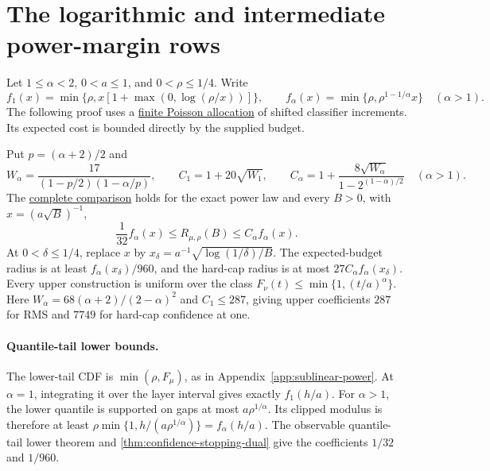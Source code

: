 \section{The logarithmic and intermediate power-margin rows}
\label{app:shifted-power}

Let $1\le\alpha<2$, $0<a\le1$, and $0<\rho\le1/4$. Write
\[
 f_1(x)=\min\{\rho,x[1+\max(0,\log(\rho/x))]\},\qquad
 f_\alpha(x)=\min\{\rho,\rho^{1-1/\alpha}x\}\quad(\alpha>1).
\]
The following proof uses a \href{https://github.com/davidiach/adaptive-threshold-estimation/blob/1f1a0229b16f16d9f7f415519f2c73d9af09b7e9/lean/ThresholdHC/ShiftedPower/Allocated.lean}{finite Poisson allocation} of shifted classifier
increments. Its expected cost is bounded directly by the supplied budget.

Put $p=(\alpha+2)/2$ and
\[
 W_\alpha=\frac{17}{(1-p/2)(1-\alpha/p)},\qquad
 C_1=1+20\sqrt{W_1},\qquad
 C_\alpha=1+\frac{8\sqrt{W_\alpha}}{1-2^{(1-\alpha)/2}}\quad(\alpha>1).
\]
The \href{https://github.com/davidiach/adaptive-threshold-estimation/blob/3950b4070f7261b6b4368568b5d823cbdd97bec4/lean/ThresholdHC/ShiftedPower/Full.lean}{complete comparison}
holds for the exact power law and every $B>0$, with $x=(a\sqrt B)^{-1}$,
\[
 \frac1{32}f_\alpha(x)\le R_{\mu,\rho}(B)\le C_\alpha f_\alpha(x).
\]
At $0<\delta\le1/4$, replace $x$ by
$x_\delta=a^{-1}\sqrt{\log(1/\delta)/B}$. The expected-budget radius
is at least $f_\alpha(x_\delta)/960$, and the hard-cap radius is at most
$27C_\alpha f_\alpha(x_\delta)$. Every upper construction is uniform over
the class $F_\nu(t)\le\min\{1,(t/a)^\alpha\}$.
Here $W_\alpha=68(\alpha+2)/(2-\alpha)^2$ and $C_1\le287$, giving
upper coefficients $287$ for RMS and $7749$ for hard-cap confidence at one.

\paragraph{Quantile-tail lower bounds.}
The lower-tail CDF is $\min(\rho,F_\mu)$, as in
Appendix~\ref{app:sublinear-power}. At $\alpha=1$, integrating it over
the layer interval gives exactly $f_1(h/a)$.
For $\alpha>1$, the lower quantile is supported on gaps at most
$a\rho^{1/\alpha}$. Its clipped modulus is therefore at least
$\rho\min\{1,h/(a\rho^{1/\alpha})\}=f_\alpha(h/a)$.
The observable quantile-tail lower theorem and
\cref{thm:confidence-stopping-dual} give the coefficients $1/32$ and $1/960$.

